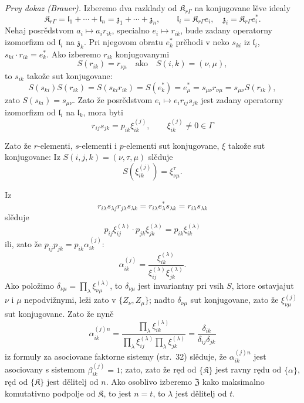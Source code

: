 \documentclass[11pt]{article}
\begin{document}
\emph{Prvy dokaz (Brauer).} Izberemo dva razklady od \(\mathfrak K_{r\Gamma}\) na konjugovane lěve idealy
\[
\mathfrak K_{r\Gamma}=\mathfrak l_1+\cdots+\mathfrak l_n=\mathfrak z_1+\cdots+\mathfrak z_n,\qquad
\mathfrak l_i=\mathfrak K_{r\Gamma}e_i,\quad
\mathfrak z_i=\mathfrak K_{r\Gamma}e_i^*.
\]
Nehaj posrědstvom \(a_i\mapsto a_ir_{ik}\), specialno \(e_i\mapsto r_{ik}\), bude zadany operatorny izomorfizm od \(\mathfrak l_i\) na \(\mathfrak z_k\). Pri njegovom obratu \(e_k^*\) prěhodi v neko \(s_{ki}\) iz \(\mathfrak l_i\), \(s_{ki}\cdot r_{ik}=e_k^*\). Ako izberemo \(r_{ik}\) konjugovanymi
\[
S(r_{ik})=r_{\nu\mu}\quad\text{ako}\quad S(i,k)=(\nu,\mu),
\]
to \(s_{ik}\) takože sut konjugovane:
\[
S(s_{ki})S(r_{ik})=S(s_{ki}r_{ik})=S(e_k^*)=e_\mu^*
=s_{\mu\nu}r_{\nu\mu}=s_{\mu\nu}S(r_{ik}),
\]
zato \(S(s_{ki})=s_{\mu\nu}\). Zato že posrědstvom \(e_i\mapsto e_ir_{ij}s_{jk}\) jest zadany operatorny izomorfizm od \(\mathfrak l_i\) na \(\mathfrak l_k\), mora byti
\[
r_{ij}s_{jk}=p_{ik}\xi_{ik}^{(j)},\qquad
\xi_{ik}^{(j)}\ne0\in\Gamma
\]

Zato že \(r\)-elementi, \(s\)-elementi i \(p\)-elementi sut konjugovane, \(\xi\) takože sut konjugovane: Iz \(S(i,j,k)=(\nu,\tau,\mu)\) slěduje
\[
S(\xi_{ik}^{(j)})=\xi_{\nu\mu}^{\tau}.
\]

Iz
\[
r_{i\lambda}s_{\lambda j}r_{j\lambda}s_{\lambda k}
=r_{i\lambda}e_\lambda^*s_{\lambda k}
=r_{i\lambda}s_{\lambda k}
\]
slěduje
\[
p_{ij}\xi_{ij}^{(\lambda)}\cdot p_{jk}\xi_{jk}^{(\lambda)}
=p_{ik}\xi_{ik}^{(\lambda)}
\]
ili, zato že \(p_{ij}p_{jk}=p_{ik}\alpha_{ik}^{(j)}\):
\[
\alpha_{ik}^{(j)}
=\frac{\xi_{ik}^{(\lambda)}}{\xi_{ij}^{(\lambda)}\xi_{jk}^{(\lambda)}}.
\]
Ako položimo \(\delta_{\nu\mu}=\prod_{\lambda}\xi_{\nu\mu}^{(\lambda)}\), to \(\delta_{\nu\mu}\) jest invariantny pri vsih \(S\), ktore ostavjajut \(\nu\) i \(\mu\) nepodvižnymi, leži zato v \(\{Z_\nu,Z_\mu\}\); nadto \(\delta_{\nu\mu}\) sut konjugovane, zato že \(\xi_{\nu\mu}^{(j)}\) sut konjugovane. Zato že nyně
\[
\alpha_{ik}^{(j)n}
=\frac{\prod_{\lambda}\xi_{ik}^{(\lambda)}}
       {\prod_{\lambda}\xi_{ij}^{(\lambda)}\prod_{\lambda}\xi_{jk}^{(\lambda)}}
=\frac{\delta_{ik}}{\delta_{ij}\delta_{jk}}
\]
iz formuly za asociovane faktorne sistemy (str.~32) slěduje, že \(\alpha_{ik}^{(j)n}\) jest asociovany s sistemom \(\beta_{ik}^{(j)}=1\); zato, zato že ręd od \(\{\mathfrak K\}\) jest ravny rędu od \(\{\alpha\}\), ręd od \(\{\mathfrak K\}\) jest dělitelj od \(n\). Ako osoblivo izberemo \(\mathfrak Z\) kako maksimalno komutativno podpolje od \(\mathfrak K\), to jest \(n=t\), to \(\lambda\) jest dělitelj od \(t\).
\end{document}
